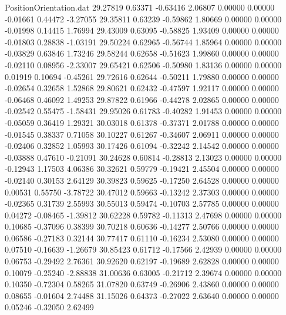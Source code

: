 \begin{filecontents}{PositionOrientation.dat}
  29.27819    0.63371   -0.63416     2.06807    0.00000    0.00000   -0.01661    0.44472   -3.27055
  29.35811    0.63239   -0.59862     1.80669    0.00000    0.00000   -0.01998    0.14415    1.76994
  29.43009    0.63095   -0.58825     1.93409    0.00000    0.00000   -0.01803    0.28838   -1.03191
  29.50224    0.62965   -0.56744     1.85964    0.00000    0.00000   -0.03829    0.63846    1.73246
  29.58244    0.62658   -0.51623     1.99860    0.00000    0.00000   -0.02110    0.08956   -2.33007
  29.65421    0.62506   -0.50980     1.83136    0.00000    0.00000    0.01919    0.10694   -0.45261
  29.72616    0.62644   -0.50211     1.79880    0.00000    0.00000   -0.02654    0.32658    1.52868
  29.80621    0.62432   -0.47597     1.92117    0.00000    0.00000   -0.06468    0.46092    1.49253
  29.87822    0.61966   -0.44278     2.02865    0.00000    0.00000   -0.02542    0.55475   -1.58431
  29.95026    0.61783   -0.40282     1.91453    0.00000    0.00000   -0.05059    0.36419    1.29321
  30.03018    0.61378   -0.37371     2.01788    0.00000    0.00000   -0.01545    0.38337    0.71058
  30.10227    0.61267   -0.34607     2.06911    0.00000    0.00000   -0.02406    0.32852    1.05993
  30.17426    0.61094   -0.32242     2.14542    0.00000    0.00000   -0.03888    0.47610   -0.21091
  30.24628    0.60814   -0.28813     2.13023    0.00000    0.00000   -0.12943    1.17503    4.06386
  30.32621    0.59779   -0.19421     2.45504    0.00000    0.00000   -0.02140    0.30153    2.64129
  30.39823    0.59625   -0.17250     2.64528    0.00000    0.00000    0.00531    0.55750   -3.78722
  30.47012    0.59663   -0.13242     2.37303    0.00000    0.00000   -0.02365    0.31739    2.55993
  30.55013    0.59474   -0.10703     2.57785    0.00000    0.00000    0.04272   -0.08465   -1.39812
  30.62228    0.59782   -0.11313     2.47698    0.00000    0.00000    0.10685   -0.37096    0.38399
  30.70218    0.60636   -0.14277     2.50766    0.00000    0.00000    0.06586   -0.27183    0.32144
  30.77417    0.61110   -0.16234     2.53080    0.00000    0.00000    0.07510   -0.16639   -1.26679
  30.85423    0.61712   -0.17566     2.42939    0.00000    0.00000    0.06753   -0.29492    2.76361
  30.92620    0.62197   -0.19689     2.62828    0.00000    0.00000    0.10079   -0.25240   -2.88838
  31.00636    0.63005   -0.21712     2.39674    0.00000    0.00000    0.10350   -0.72304    0.58265
  31.07820    0.63749   -0.26906     2.43860    0.00000    0.00000    0.08655   -0.01604    2.74488
  31.15026    0.64373   -0.27022     2.63640    0.00000    0.00000    0.05246   -0.32050    2.62499

\end{filecontents}

